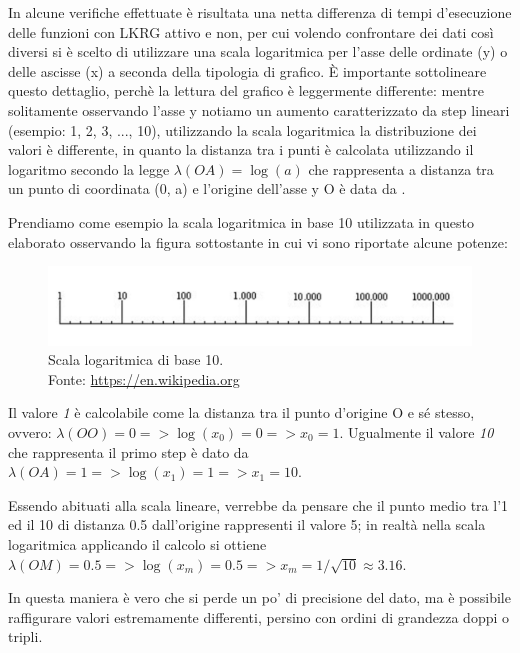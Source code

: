 In alcune verifiche effettuate è risultata una netta differenza di tempi d'esecuzione delle funzioni con LKRG attivo e non, per cui volendo confrontare dei dati così diversi si è scelto di utilizzare una scala logaritmica per l'asse delle ordinate (y) o delle ascisse (x) a seconda della tipologia di grafico. È importante sottolineare questo dettaglio, perchè la lettura del grafico è leggermente differente: mentre solitamente osservando l'asse y notiamo un aumento caratterizzato da step lineari (esempio: 1, 2, 3, ..., 10), utilizzando la scala logaritmica la distribuzione dei valori è differente, in quanto la distanza tra i punti è calcolata utilizzando il logaritmo secondo la legge $\lambda (OA)= \log (a)$ che rappresenta a distanza tra un punto di coordinata (0, a) e l'origine dell'asse y O è data da .

Prendiamo come esempio la scala logaritmica in base 10 utilizzata in questo elaborato osservando la figura sottostante in cui vi sono riportate alcune potenze:

\begin{figure}[!ht]
\centering
\includegraphics[scale=0.2]{Figures/LogarithmicScale}
\caption[Scala logaritmica di base 10.]{Scala logaritmica di base 10.\\Fonte: \href{https://it.wikipedia.org/wiki/Scala_logaritmica}{https://en.wikipedia.org}}
\label{fig:logarithmicScale}
\end{figure}

Il valore \emph{1} è calcolabile come la distanza tra il punto d'origine O e sé stesso, ovvero: $\lambda (OO) = 0 => \log (x_0) = 0 => x_0 = 1$. Ugualmente il valore \emph{10} che rappresenta il primo step è dato da $\lambda (OA) = 1 => \log (x_1) = 1 => x_1 = 10$.

Essendo abituati alla scala lineare, verrebbe da pensare che il punto medio tra l'1 ed il 10 di distanza 0.5 dall'origine rappresenti il valore 5; in realtà nella scala logaritmica applicando il calcolo si ottiene $\lambda (OM) = 0.5 => \log (x_m) = 0.5 => x_m = 1/\sqrt{10} \approx 3.16$.

In questa maniera è vero che si perde un po' di precisione del dato, ma è possibile raffigurare valori estremamente differenti, persino con ordini di grandezza doppi o tripli.

